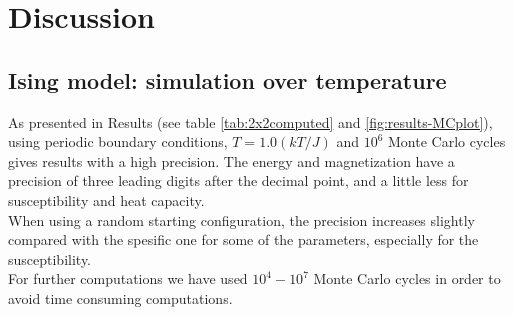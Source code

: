 \documentclass[../main.tex]{subfiles}
\begin{document}
\section{Discussion}\label{discussion}

\subsection{Ising model: simulation over temperature}
As presented in Results (see table \ref{tab:2x2computed} and \ref{fig:results-MCplot}), using periodic boundary conditions, $T = 1.0(kT/J)$ and $10^6$ Monte Carlo cycles gives results with a high precision. The energy and magnetization have a precision of three leading digits after the decimal point, and a little less for susceptibility and heat capacity. \\
When using a random starting configuration, the precision increases slightly compared with the spesific one for some of the parameters, especially for the susceptibility. \\
For further computations we have used $10^4 - 10^7$ Monte Carlo cycles in order to avoid time consuming computations.

\end{document}
